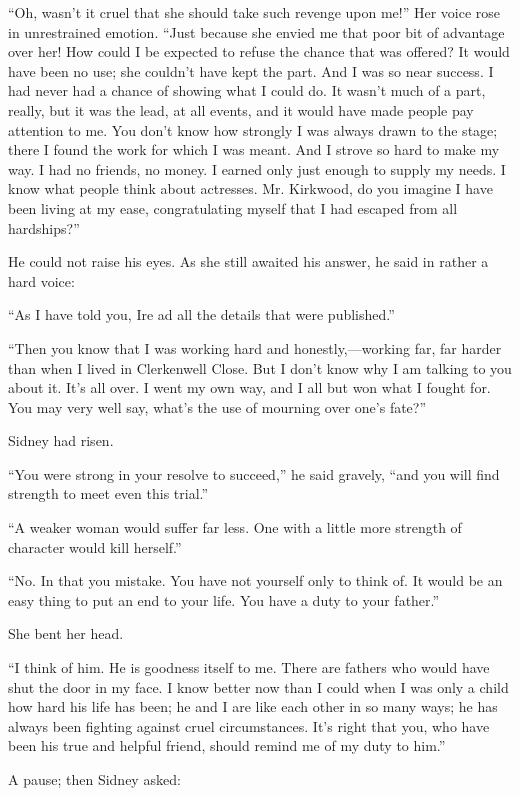 ``Oh, wasn't it cruel that she should take such revenge upon me!'' Her
voice rose in unrestrained emotion. ``Just because she envied me that
poor bit of advantage over her! How could I be expected to refuse the
chance that was offered? It would have been no use; she couldn't have
kept the part. And I was so near success. I had never had a chance of
showing what I could do. It wasn't much of a part, really, but it was
the lead, at all events, and it would have made people pay attention to
me. You don't know how strongly I was always drawn to the stage; there I
found the work for which I was meant. And I strove so hard to make my
way. I had no friends, no money. I earned only just enough to supply my
needs. I know what {}people think about actresses. Mr. Kirkwood, do you
imagine I have been living at my ease, congratulating myself that I had
escaped from all hardships?''

He could not raise his eyes. As she still awaited his answer, he said in
rather a hard voice:

``As I have told you, Ire ad all the details that were published.''

``Then you know that I was working hard and honestly,---working far, far
harder than when I lived in Clerkenwell Close. But I don't know why I am
talking to you about it. It's all over. I went my own way, and I all but
won what I fought for. You may very well say, what's the use of mourning
over one's fate?''

Sidney had risen.

``You were strong in your resolve to succeed,'' he said gravely, ``and
you will find strength to meet even this trial.''

``A weaker woman would suffer far less. One with a little more strength
of character would kill herself.''

``No. In that you mistake. You have not yourself only to think of. It
would be an {}easy thing to put an end to your life. You have a duty to
your father.''

She bent her head.

``I think of him. He is goodness itself to me. There are fathers who
would have shut the door in my face. I know better now than I could when
I was only a child how hard his life has been; he and I are like each
other in so many ways; he has always been fighting against cruel
circumstances. It's right that you, who have been his true and helpful
friend, should remind me of my duty to him.''

A pause; then Sidney asked:

